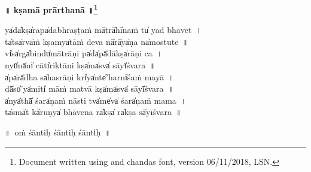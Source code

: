 \documentclass[parskip, DIV=14]{scrartcl}
\renewcommand{\thefootnote}{\fnsymbol{footnote}} %
\begin{document}

\vspace{-1.5cm}

\begin{center}
\textbf{{\Huge\vspace{0.201cm} ॥  kṣamā prārthanā ॥\LARGE\let\thefootnote\relax\footnote{\color{lightgray} Document written using \XeLaTeX{} and chandas font, version 06/11/2018, LSN.}}}
\LARGE
  
  ya̍da̍kṣa̍rapa̍dabhra॒ṣṭaṁ mā̍trā̍hī̍naṁ tu̍ yad bha॒ve॒t~। \\
  ta̍tsa̍rva̍ṁ kṣamya̍tāṁ de॒va nā̍rā̍ya̍ṇa na̍mostu॒te॒~॥ \\
  vi̍sa̍rga̍bindu̍mātrā॒ṇi pa̍da̍pā̍dākṣa̍rāṇi॒ ca॒~। \\
  nyū̍nā̍ni̍ cāti̍riktā॒ni kṣa̍ma̍sva̍ sāyī̍śva॒ra॒~॥ \\
  a̍pa̍rā̍dha sa̍hasrā॒ṇi kri̍ya̍nte̍’harni̍śaṁ ma॒yā॒~। \\
  dā̍so̍’ya̍miti̍ māṁ ma॒tvā kṣa̍ma̍sva̍ sāyī̍śva॒ra॒~॥ \\
  a̍nya̍thā̍ śara̍ṇaṁ nā॒sti tva̍me̍va̍ śara̍ṇaṁ ma॒ma॒~। \\
  ta̍smā̍t kā̍ruṇya̍ bhāve॒na ra̍kṣa̍ ra̍kṣa sā̍yīśva॒ra॒~॥ \\

\vspace{1.0cm}

॥~oṁ śānti॒ḥ śānti॒ḥ śānti̍ḥ~॥ \\ 
\end{center}
\end{document}
